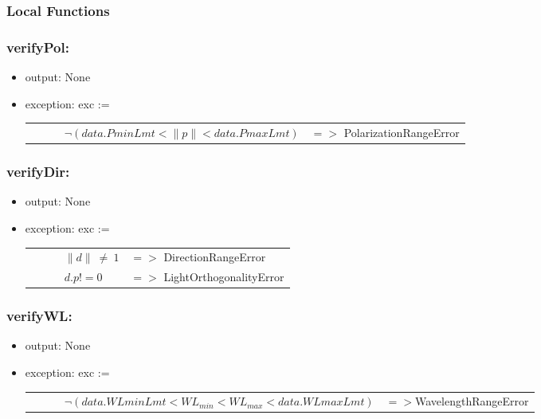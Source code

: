 \documentclass[12pt, titlepage]{article}
\begin{document}
	\subsubsection{Local Functions}
	
	\subsubsection*{verifyPol:} \begin{itemize} \item output: None \item exception:
		exc := \begin{longtable*}[l]{l l} \ \ \ \ \ \ $\neg(data.PminLmt< \|p\|<
			data.PmaxLmt)$ & $=>$ PolarizationRangeError\\ \end{longtable*}
		
	\end{itemize}
	
	\subsubsection*{verifyDir:} \begin{itemize} \item output: None \item exception:
		exc := \noindent \begin{longtable*}[l]{l l} \ \ \ \ \ \ $\|d\|\ \neq\ 1$ & $=>$
			DirectionRangeError\\ \ \ \ \ \ \ $d . p != 0$ & $=>$ LightOrthogonalityError\\
		\end{longtable*}
		
	\end{itemize}
	
	\subsubsection*{verifyWL:} \begin{itemize} \item output: None \item exception:
		exc := \noindent \begin{longtable*}[l]{l l} \ \ \ \ \ \ $\neg
			(data.WLminLmt<WL_{min}<WL_{max}<data.WLmaxLmt)$ &$=>$WavelengthRangeError\\
		\end{longtable*}
		
	\end{itemize}
	
\end{document}
